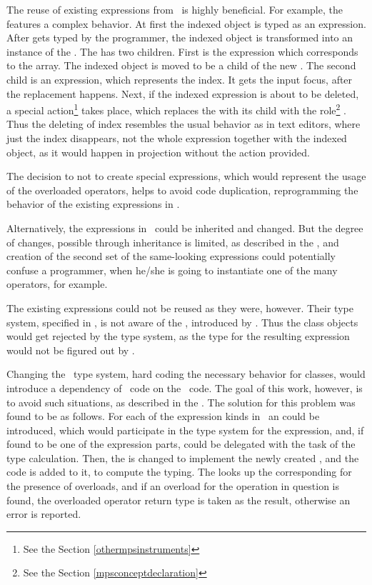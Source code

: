 The reuse of existing expressions from \mbdr\ is highly beneficial. 
For example,  the  features a complex behavior. At first the indexed 
object is typed as an expression. After \cc{[} gets typed by the programmer,
the indexed object is transformed into an instance of the 
. The  has two children. First is the expression
which corresponds to the array. The indexed object is moved to be a child of the new .
The second child is an expression, which represents the index. It gets the input focus,
after the replacement happens.
Next, if the indexed expression is about to be deleted, a special action\footnote{See the Section \ref{othermpsinstruments}}
takes place, which replaces the  with its child with the role\footnote{See the Section \ref{mpsconceptdeclaration}}
. Thus the deleting of index resembles the usual behavior as in text editors, where
just the index disappears, not the whole expression together with the indexed object, as it would happen in
projection without the action provided.

The decision to not to create special expressions, which would represent the usage of
the overloaded operators, helps to avoid code duplication, reprogramming the behavior of
the existing expressions in \mbdr. 

Alternatively, the expressions in \mbdr\ could be inherited and changed. But the 
degree of changes, possible through inheritance is limited, as described in the ,
and creation of the second set of the same-looking expressions could potentially confuse a
programmer, when he/she is going to instantiate one of the many \cc{+} operators, for example.

The existing expressions could not be reused as they were, however. Their type system, specified
in \mbdr, is not aware of the , introduced by \pcpp. Thus the class
objects would get rejected by the type system, as the type for the resulting expression
would not be figured out by \mbdr.

Changing the \mbdr\ type system, hard coding the necessary behavior for classes, would 
introduce a dependency of \mbdr\ code on the \pcpp\ code. The goal of this work, however,
is to avoid such situations, as described in the .
The solution for this problem was found to be as follows. For each of the expression kinds 
in \mbdr\ an  could be introduced, which would participate in the 
type system for the expression, and, if found to be one of the expression parts, could 
be delegated with the task of the type calculation. Then, the  is changed
to implement the newly created , and the code is added to it, to 
compute the typing. The  looks up the corresponding  for 
the presence of overloads, and if an overload for the operation in question is found, 
the overloaded operator return type is taken as the result, otherwise an error is reported.

